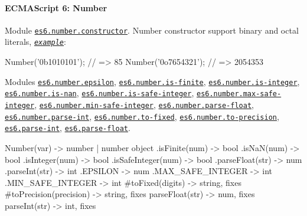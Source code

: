  \paragraph*{E\+C\+M\+A\+Script 6\+: Number}

Module \href{https://github.com/zloirock/core-js/blob/v2.6.0/modules/es6.number.constructor.js}{\tt {\ttfamily es6.\+number.\+constructor}}. {\ttfamily Number} constructor support binary and octal literals, \href{http://goo.gl/jRd6b3}{\tt {\itshape example}}\+: 
\begin{DoxyCode}
Number('0b1010101'); // => 85
Number('0o7654321'); // => 2054353
\end{DoxyCode}
 Modules \href{https://github.com/zloirock/core-js/blob/v2.6.0/modules/es6.number.epsilon.js}{\tt {\ttfamily es6.\+number.\+epsilon}}, \href{https://github.com/zloirock/core-js/blob/v2.6.0/modules/es6.number.is-finite.js}{\tt {\ttfamily es6.\+number.\+is-\/finite}}, \href{https://github.com/zloirock/core-js/blob/v2.6.0/modules/es6.number.is-integer.js}{\tt {\ttfamily es6.\+number.\+is-\/integer}}, \href{https://github.com/zloirock/core-js/blob/v2.6.0/modules/es6.number.is-nan.js}{\tt {\ttfamily es6.\+number.\+is-\/nan}}, \href{https://github.com/zloirock/core-js/blob/v2.6.0/modules/es6.number.is-safe-integer.js}{\tt {\ttfamily es6.\+number.\+is-\/safe-\/integer}}, \href{https://github.com/zloirock/core-js/blob/v2.6.0/modules/es6.number.max-safe-integer.js}{\tt {\ttfamily es6.\+number.\+max-\/safe-\/integer}}, \href{https://github.com/zloirock/core-js/blob/v2.6.0/modules/es6.number.min-safe-integer.js}{\tt {\ttfamily es6.\+number.\+min-\/safe-\/integer}}, \href{https://github.com/zloirock/core-js/blob/v2.6.0/modules/es6.number.parse-float.js}{\tt {\ttfamily es6.\+number.\+parse-\/float}}, \href{https://github.com/zloirock/core-js/blob/v2.6.0/modules/es6.number.parse-int.js}{\tt {\ttfamily es6.\+number.\+parse-\/int}}, \href{https://github.com/zloirock/core-js/blob/v2.6.0/modules/es6.number.to-fixed.js}{\tt {\ttfamily es6.\+number.\+to-\/fixed}}, \href{https://github.com/zloirock/core-js/blob/v2.6.0/modules/es6.number.to-precision.js}{\tt {\ttfamily es6.\+number.\+to-\/precision}}, \href{https://github.com/zloirock/core-js/blob/v2.6.0/modules/es6.parse-int.js}{\tt {\ttfamily es6.\+parse-\/int}}, \href{https://github.com/zloirock/core-js/blob/v2.6.0/modules/es6.parse-float.js}{\tt {\ttfamily es6.\+parse-\/float}}. 
\begin{DoxyCode}
[new] Number(var)         -> number | number object
  .isFinite(num)          -> bool
  .isNaN(num)             -> bool
  .isInteger(num)         -> bool
  .isSafeInteger(num)     -> bool
  .parseFloat(str)        -> num
  .parseInt(str)          -> int
  .EPSILON                -> num
  .MAX\_SAFE\_INTEGER       -> int
  .MIN\_SAFE\_INTEGER       -> int
  #toFixed(digits)        -> string, fixes
  #toPrecision(precision) -> string, fixes
parseFloat(str)           -> num, fixes
parseInt(str)             -> int, fixes
\end{DoxyCode}
